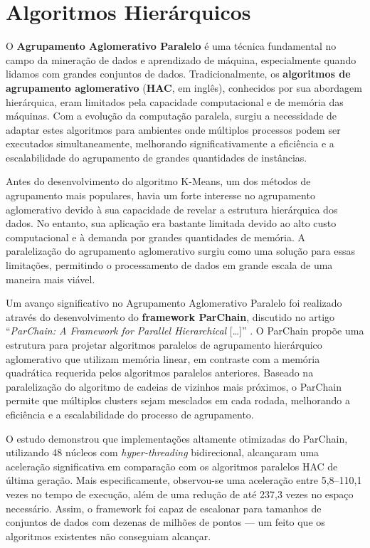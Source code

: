 \documentclass[12pt,
openright, 
oneside, %
a4paper,    %
brazil]{facom-ufu-abntex2}
\begin{document}

\section{Algoritmos Hierárquicos}

O \textbf{Agrupamento Aglomerativo Paralelo} é uma técnica fundamental no campo da mineração de dados e aprendizado de máquina, especialmente quando lidamos com grandes conjuntos de dados. Tradicionalmente, os \textbf{algoritmos de agrupamento aglomerativo} (\textbf{HAC}, em inglês), conhecidos por sua abordagem hierárquica, eram limitados pela capacidade computacional e de memória das máquinas. Com a evolução da computação paralela, surgiu a necessidade de adaptar estes algoritmos para ambientes onde múltiplos processos podem ser executados simultaneamente, melhorando significativamente a eficiência e a escalabilidade do agrupamento de grandes quantidades de instâncias.

Antes do desenvolvimento do algoritmo K-Means, um dos métodos de agrupamento mais populares, havia um forte interesse no agrupamento aglomerativo devido à sua capacidade de revelar a estrutura hierárquica dos dados. No entanto, sua aplicação era bastante limitada devido ao alto custo computacional e à demanda por grandes quantidades de memória. A paralelização do agrupamento aglomerativo surgiu como uma solução para essas limitações, permitindo o processamento de dados em grande escala de uma maneira mais viável.

Um avanço significativo no Agrupamento Aglomerativo Paralelo foi realizado através do desenvolvimento do \textbf{framework ParChain}, discutido no artigo \enquote{\textit{ParChain: A Framework for Parallel Hierarchical} [\dots]} \cite{parChainHAC2021}. O ParChain propõe uma estrutura para projetar algoritmos paralelos de agrupamento hierárquico aglomerativo que utilizam memória linear, em contraste com a memória quadrática requerida pelos algoritmos paralelos anteriores. Baseado na paralelização do algoritmo de cadeias de vizinhos mais próximos, o ParChain permite que múltiplos clusters sejam mesclados em cada rodada, melhorando a eficiência e a escalabilidade do processo de agrupamento.

O estudo demonstrou que implementações altamente otimizadas do ParChain, utilizando 48 núcleos com \textit{hyper-threading} bidirecional, alcançaram uma aceleração significativa em comparação com os algoritmos paralelos HAC de última geração. Mais especificamente, observou-se uma aceleração entre 5,8--110,1 vezes no tempo de execução, além de uma redução de até 237,3 vezes no espaço necessário. Assim, o framework foi capaz de escalonar para tamanhos de conjuntos de dados com dezenas de milhões de pontos --- um feito que os algoritmos existentes não conseguiam alcançar.
\end{document}
